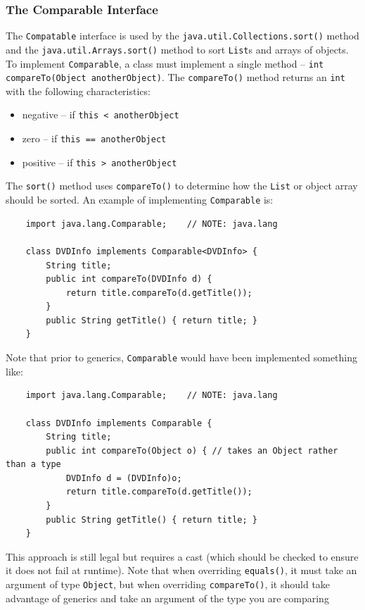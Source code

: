 \subsubsection{The Comparable Interface}
The \verb#Compatable# interface is used by the \verb#java.util.Collections.sort()# method 
and the \verb#java.util.Arrays.sort()# method to sort \verb#List#s and arrays 
of objects. To implement \verb#Comparable#, a class must implement a single 
method -- \verb#int compareTo(Object anotherObject)#. The \verb#compareTo()# 
method returns an \verb#int# with the following characteristics:
\begin{itemize}
    \item negative -- if \verb#this < anotherObject#
    \item zero -- if \verb#this == anotherObject#
    \item positive -- if \verb#this > anotherObject#
\end{itemize}
The \verb#sort()# method uses \verb#compareTo()# to determine how the 
\verb#List# or object array should be sorted. An example of implementing 
\verb#Comparable# is:
\begin{verbatim}
    import java.lang.Comparable;    // NOTE: java.lang

    class DVDInfo implements Comparable<DVDInfo> {
        String title;
        public int compareTo(DVDInfo d) {
            return title.compareTo(d.getTitle());
        }
        public String getTitle() { return title; }
    }
\end{verbatim}
Note that prior to generics, \verb#Comparable# would have been implemented 
something like:
\begin{verbatim}
    import java.lang.Comparable;    // NOTE: java.lang

    class DVDInfo implements Comparable {
        String title;
        public int compareTo(Object o) { // takes an Object rather than a type
            DVDInfo d = (DVDInfo)o;
            return title.compareTo(d.getTitle());
        }
        public String getTitle() { return title; }
    }
\end{verbatim}
This approach is still legal but requires a cast (which should be checked to 
ensure it does not fail at runtime). Note that when overriding \verb#equals()#,
it must take an argument of type \verb#Object#, but when overriding 
\verb#compareTo()#, it should take advantage of generics and take an argument 
of the type you are comparing

